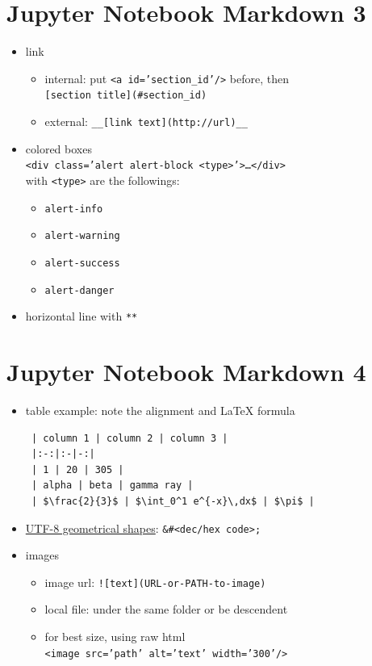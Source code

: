 \documentclass[11pt]{extarticle}
\begin{document}
\newpage

\section*{Jupyter Notebook Markdown 3}

\begin{itemize}
  \item link 
    \begin{itemize}
      \item internal: put {\tt <a id='section\_id'/>} before, then \\
        {\tt [section title](\#section\_id)}
      \item external: {\tt \_\_[link text](http://url)\_\_}
    \end{itemize}
  \item colored boxes \\{\tt <div class='alert alert-block <type>'>\dots</div>} \\
    with {\tt <type>} are the followings: 
    \begin{itemize}
      \item {\tt alert-info}
      \item {\tt alert-warning}
      \item {\tt alert-success}
      \item {\tt alert-danger}
    \end{itemize}
  \item horizontal line with {\tt ***}
\end{itemize}

\section*{Jupyter Notebook Markdown 4}

\begin{itemize}
  \item table example: note the alignment and \LaTeX{} formula
    \begin{verbatim}
 | column 1 | column 2 | column 3 |
 |:-:|:-|-:|
 | 1 | 20 | 305 |
 | alpha | beta | gamma ray |
 | $\frac{2}{3}$ | $\int_0^1 e^{-x}\,dx$ | $\pi$ |
    \end{verbatim}
  \item \href{https://www.w3schools.com/charsets/ref_utf_geometric.asp}{UTF-8 geometrical shapes}: {\tt \&\#<dec/hex code>;}  
  \item images
    \begin{itemize}
      \item image url: {\tt ![text](URL-or-PATH-to-image)}
      \item local file: under the same folder or be descendent
      \item for best size, using raw html \\
        {\tt<image src='path' alt='text' width='300'/>}
    \end{itemize}
\end{itemize}
\newpage

%
%
\end{document}
